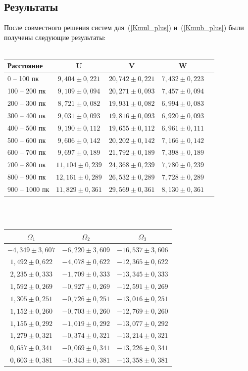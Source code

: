 \documentclass[14pt]{article} %
\begin{document}
\subsection{Результаты}\label{results}
После совместного решения систем для~(\ref{Kmul_plus}) и~(\ref{Kmub_plus}) были получены следующие результаты:\\\\
\begin{tabular}{|p{3.1cm}|c|c|c|c|}
\hline
Расстояние&U&V&W\\
\hline
0 -- 100 пк&$	9,404	\pm	0,221	$&$	20,742	\pm	0,221	$&$	7,432	\pm	0,223$\\
100 -- 200	пк&$	9,109	\pm	0,094	$&$	20,271	\pm	0,093	$&$	7,457	\pm	0,094$\\
200 -- 300	пк&$	8,721	\pm	0,082	$&$	19,931	\pm	0,082	$&$	6,994	\pm	0,083$\\
300 -- 400	пк&$	9,031	\pm	0,093	$&$	19,816	\pm	0,093	$&$	6,920	\pm	0,093$\\
400 -- 500	пк&$	9,190	\pm	0,112	$&$	19,655	\pm	0,112	$&$	6,961	\pm	0,111$\\
500 -- 600	пк&$	9,606	\pm	0,142	$&$	20,202	\pm	0,142	$&$	7,166	\pm	0,142$\\
600 -- 700	пк&$	9,697	\pm	0,189	$&$	21,792	\pm	0,189	$&$	7,398	\pm	0,189$\\
700 -- 800	пк&$	11,104	\pm	0,239	$&$	24,368	\pm	0,239	$&$	7,780	\pm	0,239$\\
800 -- 900	пк&$	12,161	\pm	0,289	$&$	26,532	\pm	0,289	$&$	7,728	\pm	0,289$\\
900 -- 1000	пк&$	11,829	\pm	0,361	$&$	29,569	\pm	0,361	$&$	8,130	\pm	0,361$\\
\hline
\end{tabular}\\\\
\begin{tabular}{|c|c|c|}
\hline
$\Omega_1$&$\Omega_2$&$\Omega_3$\\
\hline
$-4,349	\pm	3,607	$&$	-6,220	\pm	3,609	$&$	-16,537	\pm	3,606$\\
$1,492	\pm	0,622	$&$	-4,078	\pm	0,622	$&$	-12,365	\pm	0,622$\\
$2,235	\pm	0,333	$&$	-1,709	\pm	0,333	$&$	-13,345	\pm	0,333$\\
$1,592	\pm	0,269	$&$	-0,927	\pm	0,269	$&$	-12,591	\pm	0,269$\\
$1,305	\pm	0,251	$&$	-0,726	\pm	0,251	$&$	-13,016	\pm	0,251$\\
$1,152	\pm	0,260	$&$	-0,703	\pm	0,260	$&$	-12,769	\pm	0,260$\\
$1,155	\pm	0,292	$&$	-1,019	\pm	0,292	$&$	-13,077	\pm	0,292$\\
$1,279	\pm	0,321	$&$	-0,374	\pm	0,321	$&$	-13,214	\pm	0,321$\\
$0,657	\pm	0,341	$&$	-0,069	\pm	0,341	$&$	-13,226	\pm	0,341$\\
$0,603	\pm	0,381	$&$	-0,343	\pm	0,381	$&$	-13,358	\pm	0,381$\\
\hline
\end{tabular}\\\\
\end{document}
